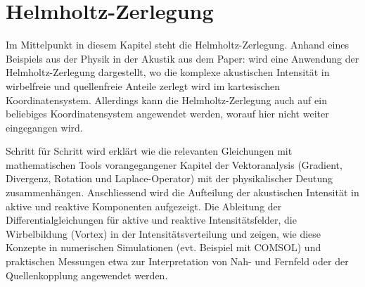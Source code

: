 %
%
%
%
\chapter{Helmholtz-Zerlegung\label{chapter:helmholtz}}
\begin{refsection}

Im Mittelpunkt in diesem Kapitel steht die Helmholtz-Zerlegung. Anhand eines Beispiels aus der Physik in der Akustik aus dem Paper: \newline \glqq \cite{Instantaneous and Time-averaged Energy Transfer in Acoustic Fields}\grqq wird eine Anwendung der Helmholtz-Zerlegung dargestellt, wo die komplexe akustischen Intensität in wirbelfreie und quellenfreie Anteile zerlegt wird im kartesischen Koordinatensystem. Allerdings kann die Helmholtz-Zerlegung auch auf ein beliebiges Koordinatensystem angewendet werden, worauf hier nicht weiter eingegangen wird. \newline


Schritt für Schritt wird erklärt wie die relevanten Gleichungen mit mathematischen Tools vorangegangener Kapitel der Vektoranalysis (Gradient, Divergenz, Rotation und Laplace-Operator) mit der physikalischer Deutung zusammenhängen. Anschliessend wird die Aufteilung der akustischen Intensität in aktive und reaktive Komponenten aufgezeigt. Die Ableitung der Differentialgleichungen für aktive und reaktive Intensitätsfelder, die Wirbelbildung (Vortex) in der Intensitätsverteilung und zeigen, wie diese Konzepte in numerischen Simulationen (evt. Beispiel mit COMSOL) und praktischen Messungen etwa zur Interpretation von Nah- und Fernfeld oder der Quellenkopplung angewendet werden.








\printbibliography[heading=subbibliography]
\end{refsection}
